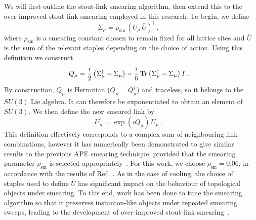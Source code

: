 We will first outline the stout-link smearing algorithm, then extend this to the over-improved stout-link smearing employed in this research. To begin, we define
%
\begin{equation}
\Sigma_\mu = \rho_\text{sm}\,(U_\mu\,\bar{U})^\dagger\, ,
\end{equation}
%
where $\rho_\text{sm}$ is a smearing constant chosen to remain fixed for all lattice sites and $\bar{U}$ is the sum of the relevant staples depending on the choice of action. Using this definition we construct
%
\begin{equation}
Q_\mu = \frac{i}{2}\left( \Sigma_\mu^\dagger - \Sigma_\mu \right) - \frac{i}{6}\operatorname{Tr}\left(\Sigma_\mu^\dagger - \Sigma_\mu\right)I\, .
\end{equation}
By construction, $Q_\mu$ is Hermitian ($Q_\mu = Q_\mu^\dagger$) and traceless, so it belongs to the $SU(3)$ Lie algebra. It can therefore be exponentiated to obtain an element of $SU(3)$. We then define the new smeared link by
%
\begin{equation}
U_\mu^\prime = \exp(iQ_\mu)\,U_\mu\, .
\end{equation}
%
This definition effectively corresponds to a complex sum of neighbouring link combinations, however it has numerically been demonstrated to give similar results to the previous APE smearing technique, provided that the smearing parameter $\rho_\text{sm}$ is selected appropriately~\cite{Morningstar:2003gk}. For this work, we choose $\rho_\text{sm}=0.06$, in accordance with the results of Ref.~\cite{Moran:2008ra}. As in the case of cooling, the choice of staples used to define $\bar{U}$ has significant impact on the behaviour of topological objects under smearing. To this end, work has been done to tune the smearing algorithm so that it preserves instanton-like objects under repeated smearing sweeps, leading to the development of over-improved stout-link smearing~\cite{Moran:2008ra}.\\

